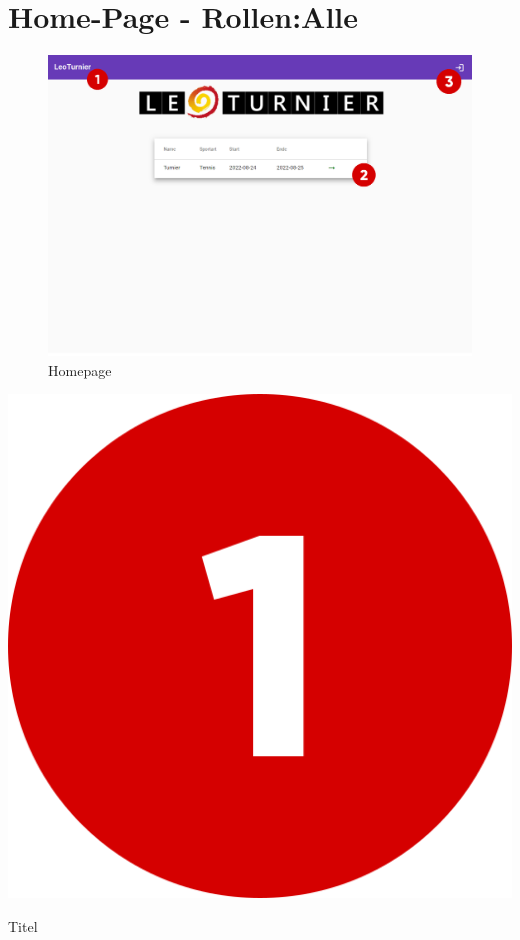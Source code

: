 \section{Home-Page - Rollen:Alle}
\begin{figure}[H]
    \includegraphics[scale=0.4]{pics/user-guide/homepage.png}
    \caption{Homepage}
\end{figure}
\bigskip

\includegraphics[scale=0.05]{pics/user-guide/numbers/number-1.png} \begin{LARGE} Titel \end{LARGE}

